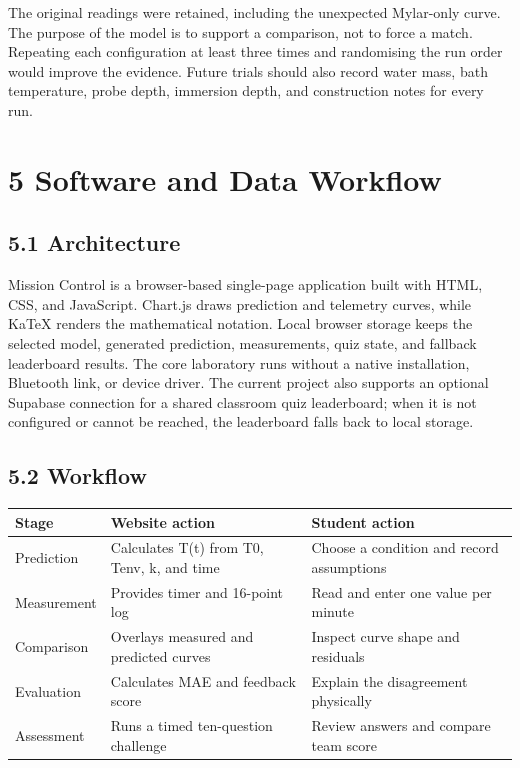 \documentclass[10pt,conference,a4paper]{IEEEtran}
\begin{document}
The original readings were retained, including the unexpected Mylar-only curve. The purpose of the model is to support a comparison, not to force a match. Repeating each configuration at least three times and randomising the run order would improve the evidence. Future trials should also record water mass, bath temperature, probe depth, immersion depth, and construction notes for every run.

\section*{5 Software and Data Workflow}

\subsection*{5.1 Architecture}

Mission Control is a browser-based single-page application built with HTML, CSS, and JavaScript. Chart.js draws prediction and telemetry curves, while KaTeX renders the mathematical notation. Local browser storage keeps the selected model, generated prediction, measurements, quiz state, and fallback leaderboard results. The core laboratory runs without a native installation, Bluetooth link, or device driver. The current project also supports an optional Supabase connection for a shared classroom quiz leaderboard; when it is not configured or cannot be reached, the leaderboard falls back to local storage.

\subsection*{5.2 Workflow}

\begin{center}\footnotesize
\setlength{\tabcolsep}{2.5pt}
\renewcommand{\arraystretch}{1.14}
\begin{tabular}{>{\raggedright\arraybackslash}p{}>{\raggedright\arraybackslash}p{}>{\raggedright\arraybackslash}p{}}
\toprule
\textbf{Stage} & \textbf{Website action} & \textbf{Student action} \\
\midrule
Prediction & Calculates T(t) from T0, Tenv, k, and time & Choose a condition and record assumptions \\
Measurement & Provides timer and 16-point log & Read and enter one value per minute \\
Comparison & Overlays measured and predicted curves & Inspect curve shape and residuals \\
Evaluation & Calculates MAE and feedback score & Explain the disagreement physically \\
Assessment & Runs a timed ten-question challenge & Review answers and compare team score \\
\bottomrule
\end{tabular}
\end{center}
\end{document}
